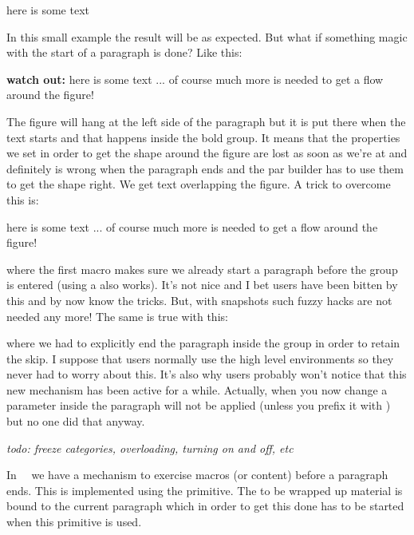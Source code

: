  here is some text
\stoptyping

In this small example the result will be as expected. But what if something magic
with the start of a paragraph is done? Like this:

\starttyping[option=TEX]

{\bf watch out:} here is some text ... of course much more is needed to
    get a flow around the figure!
\stoptyping

The figure will hang at the left side of the paragraph but it is put there when
the text starts and that happens inside the bold group. It means that the
properties we set in order to get the shape around the figure are lost as soon as
we're at  and definitely is wrong when the
paragraph ends and the par builder has to use them to get the shape right. We get
text overlapping the figure. A trick to overcome this is:

\starttyping[option=TEX]
 here is some text ... of course much
    more is needed to get a flow around the figure!
\stoptyping

where the first macro makes sure we already start a paragraph before the group is
entered (using a \type {\strut} also works). It's not nice and I bet users have
been bitten by this and by now know the tricks. But, with snapshots such fuzzy
hacks are not needed any more! The same is true with this:

\stoptyping

where we had to explicitly end the paragraph inside the group in order to retain
the skip. I suppose that users normally use the high level environments so they
never had to worry about this. It's also why users probably won't notice that
this new mechanism has been active for a while. Actually, when you now change a
parameter inside the paragraph will not be applied (unless you prefix it with
\type {\frozen}) but no one did that anyway.

{\em todo: freeze categories, overloading, turning on and off, etc}

\stopsection

\startsection[title=Wraping up]

In \CONTEXT\ \LMTX\ we have a mechanism to exercise macros (or content) before a
paragraph ends. This is implemented using the \type {\wrapuppar} primitive. The
to be wrapped up material is bound to the current paragraph which in order to
get this done has to be started when this primitive is used.

